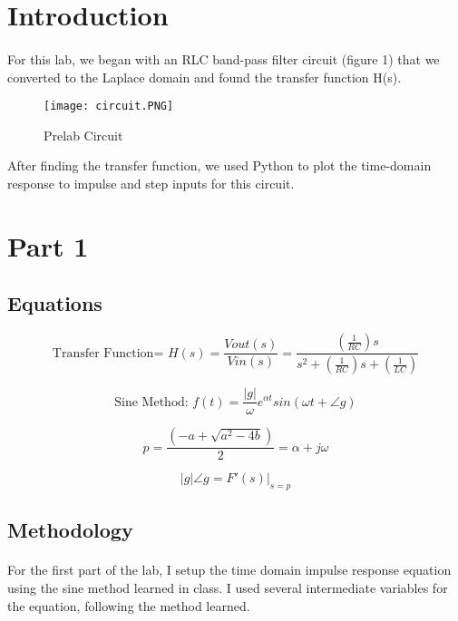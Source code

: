 \tableofcontents

\newpage
\section{Introduction}

\paragraph{}
For this lab, we began with an RLC band-pass filter circuit (figure 1) that we converted to the Laplace domain and found the transfer function H(s).

 \begin{figure}[H]
   \centering
   \texttt{[image: circuit.PNG]}
   \caption{Prelab Circuit}
 \end{figure}


After finding the transfer function, we used Python to plot the time-domain response to impulse and step inputs for this circuit.


\section{Part 1}
\subsection{Equations}

\[\text{Transfer Function= }H(s)=\dfrac{Vout(s)}{Vin(s)}=\dfrac{(\frac{1}{RC})s}{s^{2}+(\frac{1}{RC})s+(\frac{1}{LC})}\]

\[\text{Sine Method: }f(t)=\frac{|g|}{\omega}e^{\alpha t}sin(\omega t+\angle g)\]

\[p=\dfrac{(-a+\sqrt{a^{2}-4b})}{2}=\alpha + j\omega\]

\[|g|\angle g=F'(s)|_{s=p}\]

\subsection{Methodology}

\paragraph{}
For the first part of the lab, I setup the time domain impulse response equation using the sine method learned in class.  I used several intermediate variables for the equation, following the method learned.  
